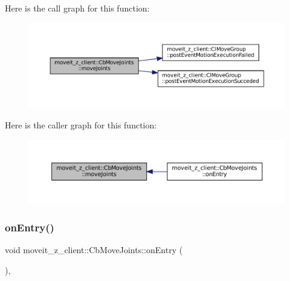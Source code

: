 Here is the call graph for this function\+:
\nopagebreak
\begin{figure}[H]
\begin{center}
\leavevmode
\includegraphics[width=350pt]{classmoveit__z__client_1_1CbMoveJoints_a4dcc7bcf0ed857d9d580d4700cdeb5db_cgraph}
\end{center}
\end{figure}
Here is the caller graph for this function\+:
\nopagebreak
\begin{figure}[H]
\begin{center}
\leavevmode
\includegraphics[width=350pt]{classmoveit__z__client_1_1CbMoveJoints_a4dcc7bcf0ed857d9d580d4700cdeb5db_icgraph}
\end{center}
\end{figure}
\mbox{\label{classmoveit__z__client_1_1CbMoveJoints_a512e97e94ab05ee12837433e5d921095}} 
\subsubsection{\texorpdfstring{on\+Entry()}{onEntry()}}
{\footnotesize\ttfamily void moveit\+\_\+z\+\_\+client\+::\+Cb\+Move\+Joints\+::on\+Entry (\begin{DoxyParamCaption}{ }\end{DoxyParamCaption})\hspace{0.3cm}{\ttfamily [override]}, {\ttfamily [virtual]}}



